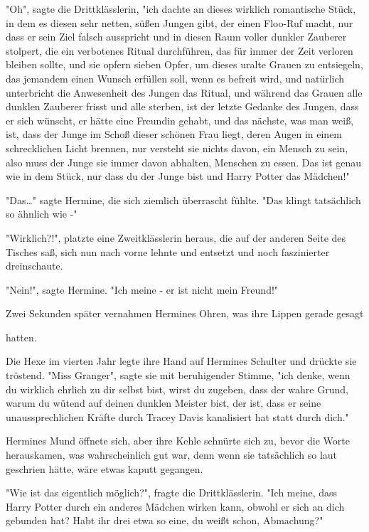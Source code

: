 {"Oh", sagte die Drittklässlerin, "ich dachte an dieses wirklich romantische Stück, in dem es diesen sehr netten, süßen Jungen gibt, der einen Floo-Ruf macht, nur dass er sein Ziel falsch ausspricht und in diesen Raum voller dunkler Zauberer stolpert, die ein verbotenes Ritual durchführen, das für immer der Zeit verloren bleiben sollte, und sie opfern sieben Opfer, um dieses uralte Grauen zu entsiegeln, das jemandem einen Wunsch erfüllen soll, wenn es befreit wird, und natürlich unterbricht die Anwesenheit des Jungen das Ritual, und während das Grauen alle dunklen Zauberer frisst und alle sterben, ist der letzte Gedanke des Jungen, dass er sich wünscht, er hätte eine Freundin gehabt, und das nächste, was man weiß, ist, dass der Junge im Schoß dieser schönen Frau liegt, deren Augen in einem schrecklichen Licht brennen, nur versteht sie nichts davon, ein Mensch zu sein, also muss der Junge sie immer davon abhalten, Menschen zu essen. Das ist genau wie in dem Stück, nur dass du der Junge bist und Harry Potter das Mädchen!"

"Das…" sagte Hermine, die sich ziemlich überrascht fühlte. "Das klingt tatsächlich so ähnlich wie -"

"Wirklich?!", platzte eine Zweitklässlerin heraus, die auf der anderen Seite des Tisches saß, sich nun nach vorne lehnte und entsetzt und noch faszinierter dreinschaute.

"Nein!", sagte Hermine. "Ich meine - er ist nicht mein Freund!"

Zwei Sekunden später vernahmen Hermines Ohren, was ihre Lippen gerade gesagt

hatten.

Die Hexe im vierten Jahr legte ihre Hand auf Hermines Schulter und drückte sie tröstend. "Miss Granger", sagte sie mit beruhigender Stimme, "ich denke, wenn du wirklich ehrlich zu dir selbst bist, wirst du zugeben, dass der wahre Grund, warum du wütend auf deinen dunklen Meister bist, der ist, dass er seine unaussprechlichen Kräfte durch Tracey Davis kanalisiert hat statt durch dich."

Hermines Mund öffnete sich, aber ihre Kehle schnürte sich zu, bevor die Worte herauskamen, was wahrscheinlich gut war, denn wenn sie tatsächlich so laut geschrien hätte, wäre etwas kaputt gegangen.

"Wie ist das eigentlich möglich?", fragte die Drittklässlerin. "Ich meine, dass Harry Potter durch ein anderes Mädchen wirken kann, obwohl er sich an dich gebunden hat? Habt ihr drei etwa so eine, du weißt schon, Abmachung?"

}
